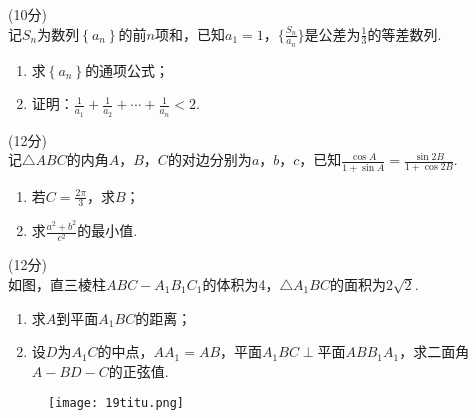 \documentclass[11pt,space]{ctexart} %
\begin{document}
\begin{enumerate}[itemsep=0.5em,topsep=5pt,resume]%
\item (10分)\\
记$S_n$为数列$\left\{a_{n}\right\}$的前$n$项和，已知$a_1=1$，$\{\frac{S_n}{a_n}\}$是公差为$\frac{1}{3}$的等差数列.

	\begin{enumerate}[itemsep=-0.3em,label={（\arabic*）},topsep=0pt,labelsep=.5em,leftmargin=3em]
	\item 求$\left\{a_{n}\right\}$的通项公式；
	\item 证明：$\frac{1}{a_1}+\frac{1}{a_2}+\cdots+\frac{1}{a_n}<2$.
\end{enumerate}

\item (12分)\\
记$\triangle ABC$的内角$A$，$B$，$C$的对边分别为$a$，$b$，$c$，已知$\frac{\cos A}{1+\sin A}=\frac{\sin 2B}{1+\cos 2B}$.
\begin{enumerate}[itemsep=-0.3em,label={（\arabic*）},topsep=0pt,labelsep=.5em,leftmargin=3em]
	\item 若$C=\frac{2\pi}{3}$，求$B$；\vspace{1em}
	\item 求$\frac{a^2+b^2}{c^2}$的最小值.
\end{enumerate}

\begin{minipage}[h]{.3\textwidth}
\item (12分)\\
如图，直三棱柱$ABC-A_1B_1C_1$的体积为4，$\triangle A_1BC$的面积为$2\sqrt{2}$.
\begin{enumerate}[itemsep=-0.3em,label={（\arabic*）},topsep=0pt,labelsep=.5em,leftmargin=3em]
	\item 求$A$到平面$A_1BC$的距离；
	\item 设$D$为$A_1C$的中点，$AA_1=AB$，平面$A_1BC\perp$平面$ABB_1A_1$，求二面角$A-BD-C$的正弦值.
\end{enumerate}
\end{minipage}\hspace{0.5em}
\begin{minipage}[h]{.2\textwidth}
\begin{figure}[H]
    \texttt{[image: 19titu.png]}	
\end{figure}
\end{minipage}\vspace{1em}


\end{enumerate}
\end{document}
